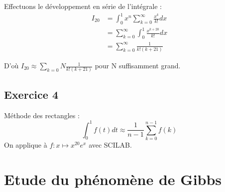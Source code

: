 \documentclass[a4paper,12pt]{article}
\begin{document}
\subsubsection{}
Effectuons le développement en série de l'intégrale :
\begin{align*}
  I_{20}
  &=\int_0^1 x^n \sum_{k=0}^ \infty \frac{x^k}{k!}dx\\
  &=\sum_{k=0}^\infty \int_0^1\frac{x^{k+20}}{k!}dx\\
  &=\sum_{k=0}^\infty\frac{1}{k!(k+21)}
\end{align*}\newline

D'où $I_{20}\approx \sum_{k=0}{N}\frac{1}{k!(k+21)}$ pour N suffisamment grand.

\subsection{Exercice 4}

Méthode des rectangles :\newline
$$
\int_0^1f(t)dt\approx\frac{1}{n-1}\sum_{k=0}^{n-1}f(k)
$$
\newline
On applique à $f:x\mapsto x^{20}e^x$ avec SCILAB.

\section{ Etude du phénomène de Gibbs}
\end{document}
